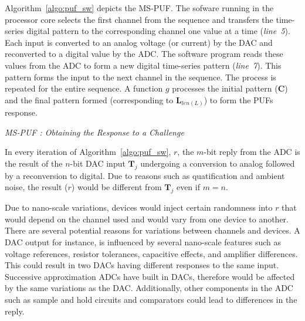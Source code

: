 Algorithm~\ref{algo:puf_sw} depicts the MS-PUF. 
The sofware running in the processor core 
selects the first channel from the sequence and 
transfers the time-series digital pattern to the corresponding
channel one value at a time ({\em line~5}). Each input is converted to an analog voltage (or
current) by the DAC and reconverted to a  digital value by the ADC.
The software program reads these values from the ADC to form a new digital time-series 
pattern ({\em line~7}). This pattern forms the input to the next channel in the sequence. The process
is repeated for the entire sequence. A function $g$ processes the initial pattern ($\mathbf C$) and 
the final pattern formed (corresponding to $\mathbf L_{len(L)}$) to form the PUFs response.

\begin{algorithm}[!ht] \label{algo:puf_sw}
\begin{scriptsize}
	\caption{\emph{MS-PUF : Obtaining the Response to a Challenge}}
	\DontPrintSemicolon
 	\LinesNumbered
\end{scriptsize}
\end{algorithm}

In every iteration of Algorithm~\ref{algo:puf_sw}, $r$, the $m$-bit 
reply from the ADC is the result of the $n$-bit DAC input $\mathbf T_j$ 
undergoing a conversion to analog followed by a reconversion to digital. 
Due to reasons such as quatification and ambient noise, the result ($r$)
would be different from $\mathbf T_j$ even if $m = n$.

Due to nano-scale variations, devices would inject certain randomness into
$r$ that would depend on the channel used and would vary from one device to another. 
There are several potential reasons for variations between channels and devices.
A DAC output for instance, is influenced by several nano-scale features such 
as voltage references, resistor tolerances, 
capacitive effects, and amplifier differences. This could result 
in two DACs having different responses to the same input. 
Successive approximation ADCs have built in DACs, therefore
would be affected by the same variations as the DAC. Additionally,
other components in the ADC such as sample and hold circuits and
comparators could lead to differences in the reply.







